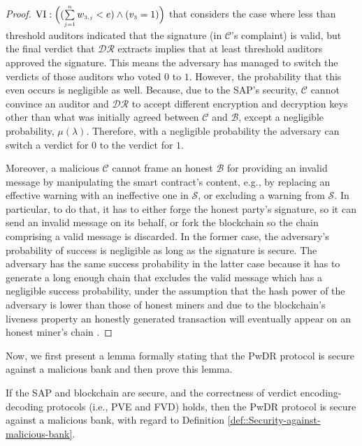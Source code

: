 \begin{proof}
 $\text{\MakeUppercase{\romannumeral 6}}: \Big((\sum\limits_{\st j=1}^{\st n}w_{\st 3,j}< {e}) \wedge ( {v}_{\st 3}=1)\Big)$ that considers the case where less than threshold auditors indicated that the signature (in $\mathcal{C}$'s complaint) is valid, but   the final verdict that $\mathcal{DR}$ extracts implies that at least threshold  auditors approved the signature. This means the adversary has managed to switch the verdicts of those auditors who voted $0$ to $1$. However, the probability that this even occurs is negligible as well. Because, due to the SAP's security,  $\mathcal{C}$ cannot convince an auditor and $\mathcal{DR}$ to accept  different encryption and decryption keys other than what was initially agreed between $\mathcal{C}$ and $\mathcal{B}$, except a negligible probability, $\mu(\lambda)$.  Therefore, with a negligible probability the adversary can switch a verdict for $0$ to the verdict for $1$. 
 
 
 Moreover, a malicious $\mathcal{C}$ cannot frame an honest $\mathcal{B}$ for providing an invalid message by manipulating the smart contract’s content,  e.g., by replacing an effective warning with an ineffective one in $\mathcal{S}$, or excluding a warning from $\mathcal{S}$. In particular, to do that, it has to either forge the honest party’s signature, so it can send an invalid message on its behalf, or fork the blockchain so the chain comprising a valid message is discarded. In the former case, the adversary’s probability of success is negligible as long as the signature is secure. The adversary has the same success probability in the latter case because it has to generate a long enough chain that excludes the valid message which has a negligible success probability, under the assumption that the hash power of the adversary is lower than those of honest miners and due to the blockchain’s liveness property an honestly generated transaction will eventually appear on an honest miner’s chain \cite{GarayKL15}. 
\end{proof}


Now, we first present a lemma formally stating that the PwDR protocol is secure against a malicious bank and then prove this lemma. 

\begin{lemma}\label{lemma::secure-against-a-malicious-bank} If the  SAP and  blockchain are secure, and the correctness of verdict encoding-decoding protocols (i.e., PVE and FVD) holds, then the PwDR protocol is secure against a malicious bank, with regard to Definition \ref{def::Security-against-malicious-bank}. 
\end{lemma}



